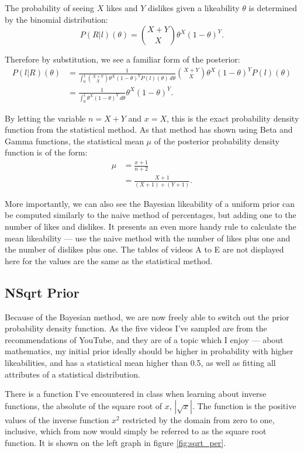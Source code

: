 \documentclass[a4paper,11pt]{article}
\begin{document}
The probability of seeing $X$ likes and $Y$ dislikes given a likeability $\theta$ is determined by the binomial distribution:
\[
    P(R|l)(\theta) = {X+Y \choose X} \theta^X (1-\theta)^Y.
\]

Therefore by substitution, we see a familiar form of the posterior:
\begin{align*}
    P(l|R)(\theta) &= \frac{1}{\int_0^1 {X+Y \choose X} \theta^X (1-\theta)^Y P(l)(\theta)\,d\theta}{X+Y \choose X} \theta^X (1-\theta)^Y P(l)(\theta)\\
    &= \frac{1}{\int_0^1 \theta^X (1-\theta)^Y \,d\theta} \theta^X (1-\theta)^Y.
\end{align*}

By letting the variable $n=X+Y$ and $x=X$, this is the exact probability density function from the statistical method. As that method has shown using Beta and Gamma functions, the statistical mean $\mu$ of the posterior probability density function is of the form:
\begin{align*}
    \mu &= \frac{x+1}{n+2}\\
    &= \frac{X+1}{(X+1) + (Y+1)}.
\end{align*}

More importantly, we can also see the Bayesian likeability of a uniform prior can be computed similarly to the naive method of percentages, but adding one to the number of likes and dislikes. It presents an even more handy rule to calculate the mean likeability --- use the naive method with the number of likes plus one and the number of dislikes plus one. The tables of videos A to E are not displayed here for the values are the same as the statistical method.

\subsection{NSqrt Prior}
Because of the Bayesian method, we are now freely able to switch out the prior probability density function. As the five videos I've sampled are from the recommendations of YouTube, and they are of a topic which I enjoy --- about mathematics, my initial prior ideally should be higher in probability with higher likeabilities, and has a statistical mean higher than 0.5, as well as fitting all attributes of a statistical distribution.

There is a function I've encountered in class when learning about inverse functions, the absolute of the square root of $x$, $|\sqrt{x}|$. The function is the positive values of the inverse function $x^2$ restricted by the domain from zero to one, inclusive, which from now would simply be referred to as the square root function. It is shown on the left graph in figure \ref{fig:sqrt_per}.
\end{document}
